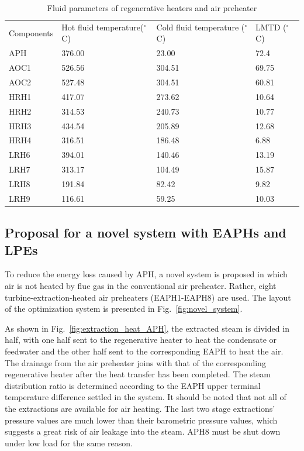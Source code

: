 \documentclass[preprint,12pt]{elsarticle}
\begin{document}
\begin{table}[htbp]
\caption{Fluid parameters of regenerative heaters and air preheater} %
\label{tab:reheater parameter}
\centering
\begin{tabular}{llll}
\toprule 
\multirow{2}{2cm}{Components} &\multirow{2}{2.7cm}{Hot fluid temperature($^\circ$C)}  & \multirow{2}{3.2cm}{Cold fluid temperature ($^\circ$C)}&\multirow{2}{2.2cm}{LMTD ($^\circ$C)}\tabularnewline
&&&\tabularnewline
\midrule
APH  &  376.00 	& 23.00  & 72.4\tabularnewline
AOC1 &   526.56 & 304.51 & 69.75\tabularnewline
AOC2 &  527.48 	& 304.51 & 60.81\tabularnewline
HRH1 &   417.07 & 273.62 & 10.64\tabularnewline
HRH2 &   314.53 & 240.73 & 10.77\tabularnewline
HRH3 &   434.54 & 205.89 & 12.68\tabularnewline
HRH4 &   316.51 & 186.48 & 6.88\tabularnewline
LRH6 &  394.01 	& 140.46 & 13.19\tabularnewline
LRH7 &   313.17 & 104.49 & 15.87\tabularnewline
LRH8 &   191.84 & 82.42  & 9.82\tabularnewline
LRH9 &   116.61 & 59.25  & 10.03\tabularnewline
\bottomrule
\end{tabular}
\end{table}




\subsection{Proposal for a novel system with EAPHs and LPEs}
\label{sub2:prop novel sys}

To reduce the energy loss caused by APH, a novel system is proposed in which air is not heated by flue gas in the conventional air preheater. Rather, eight turbine-extraction-heated air preheaters (EAPH1-EAPH8) are used.
The layout of the optimization system is presented in Fig.~\ref{fig:novel_system}.

As shown in Fig.~\ref{fig:extraction_heat_APH}, the extracted steam is divided in half, with one half sent to the regenerative heater to heat the condensate or feedwater and the other half sent to the corresponding EAPH to heat the air.
The drainage from the air preheater joins with that of the corresponding regenerative heater after the heat transfer has been completed.
The steam distribution ratio is determined according to the EAPH upper terminal temperature difference settled in the system.
It should be noted that not all of the extractions are available for air heating.
The last two stage extractions' pressure values are much lower than their barometric pressure values, which suggests a great risk of air leakage into the steam. APH8 must be shut down under low load for the same reason.
\end{document}
